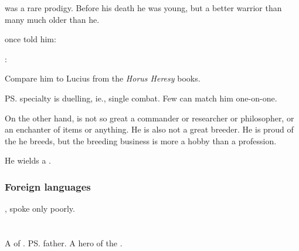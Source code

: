 \Teshrial was a rare prodigy.
Before his death he was young, but a better warrior than many \resphain much older than he.

 once told him: 
\begin{prose}
  \Menessiaraid:
\end{prose}

Compare him to Lucius from the \emph{Horus Heresy} books. 

\ps{\Teshrial} specialty is duelling, ie., single combat. 
Few \resphain{} can match him one-on-one. 

On the other hand, \Teshrial{} is not so great a commander or researcher or philosopher, or an enchanter of items or anything. 
He is also not a great \human{} breeder. 
He is proud of the \humans{} he breeds, but the breeding business is more a hobby than a profession. 

He wields a . 





\subsubsection{Foreign languages}
, \Teshrial spoke \Draconic only poorly. 















\section{\Tuerdal}
\index{\Tuerdal}
A \ketheran{} \resphan{} of \CiriathSepher. 
\ps{\Teshrial} father. 
A hero of the . 















